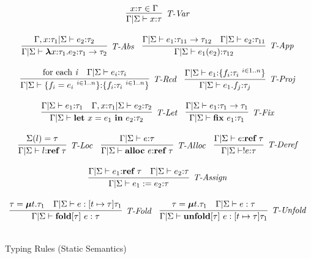 \begin{figure}
\centering
\[
\begin{array}{c}
\infer[\textit{T-Var}]
	{\Gamma | \Sigma \vdash x {:} \tau}
	{x {:} \tau \in \Gamma}
\\[3ex]
\infer[\textit{T-Abs}]
	{\Gamma | \Sigma \vdash \boldsymbol\lambda x {:} \tau_1.e_2 {:} \tau_1 \rightarrow \tau_2}
	{\Gamma, x {:} \tau_1 | \Sigma \vdash e_2 {:} \tau_2}
~~~
\infer[\textit{T-App}]
	{\Gamma | \Sigma \vdash e_1(e_2) {:} \tau_{12}}
	{\Gamma | \Sigma \vdash e_1 {:} \tau_{11} \rightarrow \tau_{12} & \Gamma | \Sigma \vdash e_2 {:} \tau_{11}}
\\[3ex]
\infer[\textit{T-Rcd}]
	{\Gamma | \Sigma \vdash \{ f_i = e_i ~ ^{i \in 1..n} \} {:} \{ f_i {:} \tau_i ~ ^{i \in 1..n} \}}
	{\textrm{for each \textit{i}} & \Gamma | \Sigma \vdash e_i {:} \tau_i}
~~~
\infer[\textit{T-Proj}]
	{\Gamma | \Sigma \vdash e_1.f_j {:} \tau_j}
	{\Gamma | \Sigma \vdash e_1 {:} \{ f_i {:} \tau_i ~ ^{i \in 1..n}\}}
\\[3ex]
\infer[\textit{T-Let}]
	{\Gamma | \Sigma \vdash \keyw{let}~ x = e_1 ~\keyw{in}~ e_2 {:} \tau_2}
	{\Gamma | \Sigma \vdash e_1{:}\tau_1 & \Gamma, x{:}\tau_1 | \Sigma \vdash e_2{:}\tau_2}
~~~
\infer[\textit{T-Fix}]
	{\Gamma | \Sigma \vdash \keyw{fix}~ e_1{:}\tau_1}
	{\Gamma | \Sigma \vdash e_1{:}\tau_1 \rightarrow \tau_1}
\\[3ex]
\infer[\textit{T-Loc}]
	{\Gamma | \Sigma \vdash l {:} \keyw{ref}~ \tau}
	{\Sigma(l) = \tau}
~~~
\infer[\textit{T-Alloc}]
	{\Gamma | \Sigma \vdash \keyw{alloc}~ e {:} \keyw{ref}~ \tau}
	{\Gamma | \Sigma \vdash e {:} \tau}
~~~
\infer[\textit{T-Deref}]
	{\Gamma | \Sigma \vdash !e {:} \tau}
	{\Gamma | \Sigma \vdash e {:} \keyw{ref}~ \tau}
\\[3ex]
\infer[\textit{T-Assign}]
	{\Gamma | \Sigma \vdash e_1 := e_2 {:} \tau}
	{\Gamma | \Sigma \vdash e_1 {:} \keyw{ref}~ \tau & \Gamma | \Sigma \vdash e_2 {:} \tau}
\\[3ex]
\infer[\textit{T-Fold}]
	{\Gamma | \Sigma \vdash \keyw{fold}[\tau]~ e : \tau}
	{\tau = \boldsymbol\mu t.\tau_1 & \Gamma | \Sigma \vdash e : [t \mapsto \tau] \tau_1}
~~~
\infer[\textit{T-Unfold}]
	{\Gamma | \Sigma \vdash \keyw{unfold}[\tau]~ e : [t \mapsto \tau] \tau_1}
	{\tau = \boldsymbol\mu t.\tau_1 & \Gamma | \Sigma \vdash e : \tau}
\\[3ex]
\end{array}
\]
\caption{Typing Rules (Static Semantics)}
\end{figure}


